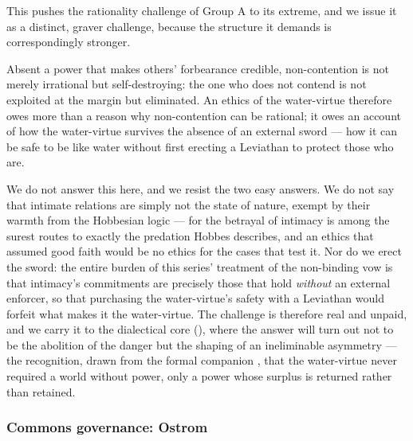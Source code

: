 This pushes the rationality challenge of Group A to its extreme, and we issue it as a distinct, graver challenge, because the structure it demands is correspondingly stronger.

\begin{claim}
Absent a power that makes others' forbearance credible, non-contention is not merely irrational but self-destroying: the one who does not contend is not exploited at the margin but eliminated. An ethics of the water-virtue therefore owes more than a reason why non-contention can be rational; it owes an account of how the water-virtue survives the absence of an external sword --- how it can be safe to be like water without first erecting a Leviathan to protect those who are.
\end{claim}

\noindent
We do not answer this here, and we resist the two easy answers. We do not say that intimate relations are simply not the state of nature, exempt by their warmth from the Hobbesian logic --- for the betrayal of intimacy is among the surest routes to exactly the predation Hobbes describes, and an ethics that assumed good faith would be no ethics for the cases that test it. Nor do we erect the sword: the entire burden of this series' treatment of the non-binding vow \parencite{paperxiii} is that intimacy's commitments are precisely those that hold \emph{without} an external enforcer, so that purchasing the water-virtue's safety with a Leviathan would forfeit what makes it the water-virtue. The challenge is therefore real and unpaid, and we carry it to the dialectical core (), where the answer will turn out not to be the abolition of the danger but the shaping of an ineliminable asymmetry --- the recognition, drawn from the formal companion \parencite{wan2026braid}, that the water-virtue never required a world without power, only a power whose surplus is returned rather than retained.

\subsubsection{Commons governance: Ostrom}
\label{p20:ssub:review-ostrom}


